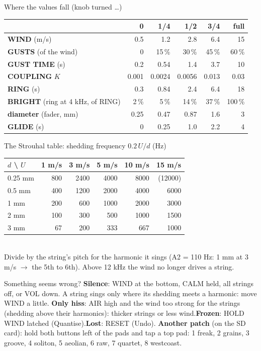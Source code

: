 \documentclass{article}
\newcommand{\FX}[1]{\textcolor{fxc}{#1}}
\newcommand{\WN}[1]{\textcolor{wndc}{#1}}
\newcommand{\ST}[1]{\textcolor{strc}{#1}}
\begin{document}
\begin{minipage}[t]{128mm}\vspace{0pt}
\begin{card}{Where the values fall (knob turned \dots)}
\fontsize{7.5}{9.2}\selectfont
\setlength{\tabcolsep}{3pt}
\begin{tabular}{@{}l r r r r r@{}}
 & 0 & 1/4 & 1/2 & 3/4 & full \\ \hline
\WN{\textbf{WIND}} (m/s) & 0.5 & 1.2 & 2.8 & 6.4 & 15 \\
\WN{\textbf{GUSTS}} (of the wind) & 0 & 15\,\% & 30\,\% & 45\,\% & 60\,\% \\
\WN{\textbf{GUST TIME}} (s) & 0.2 & 0.54 & 1.4 & 3.7 & 10 \\
\textbf{COUPLING} \(K\) & 0.001 & 0.0024 & 0.0056 & 0.013 & 0.03 \\
\ST{\textbf{RING}} (s) & 0.3 & 0.84 & 2.4 & 6.4 & 18 \\
\ST{\textbf{BRIGHT}} (ring at 4 kHz, of RING) & 2\,\% & 5\,\% & 14\,\% & 37\,\% & 100\,\% \\
\ST{\textbf{diameter}} (fader, mm) & 0.25 & 0.47 & 0.87 & 1.6 & 3 \\
\FX{\textbf{GLIDE}} (s) & 0 & 0.25 & 1.0 & 2.2 & 4 \\
\end{tabular}
\end{card}

\begin{card}{The Strouhal table: shedding frequency \(0.2\,U/d\) (Hz)}
\fontsize{7.5}{9.2}\selectfont
\setlength{\tabcolsep}{4pt}
\begin{tabular}{@{}l r r r r r@{}}
\(d\) \textbackslash{} \(U\) & 1 m/s & 3 m/s & 5 m/s & 10 m/s & 15 m/s \\ \hline
0.25 mm & 800 & 2400 & 4000 & 8000 & (12000) \\
0.5 mm & 400 & 1200 & 2000 & 4000 & 6000 \\
1 mm & 200 & 600 & 1000 & 2000 & 3000 \\
2 mm & 100 & 300 & 500 & 1000 & 1500 \\
3 mm & 67 & 200 & 333 & 667 & 1000 \\
\end{tabular}\\[0.5mm]
Divide by the string's pitch for the harmonic it sings (A2 = 110 Hz: 1 mm at 3 m/s \(\to\) the 5th to 6th).
Above 12 kHz the wind no longer drives a string.
\end{card}

\begin{card}{Something seems wrong?}
\fontsize{7.5}{9.2}\selectfont
\textbf{Silence}: WIND at the bottom, CALM held, all strings off, or VOL down. A string sings only where its shedding
meets a harmonic: move WIND a little.\quad
\textbf{Only hiss}: AIR high and the wind too strong for the strings (shedding above their harmonics): thicker
strings or less wind.\quad \textbf{Frozen}: HOLD WIND latched (Quantise).\quad \textbf{Lost}: RESET (Undo).\quad
\textbf{Another patch} (on the SD card): hold both buttons left of the pads and tap a top pad: 1 freak, 2 grains, 3 groove, 4 soliton, 5 aeolian, 6 raw, 7 quartet, 8 westcoast.
\end{card}
\end{minipage}
\end{document}
